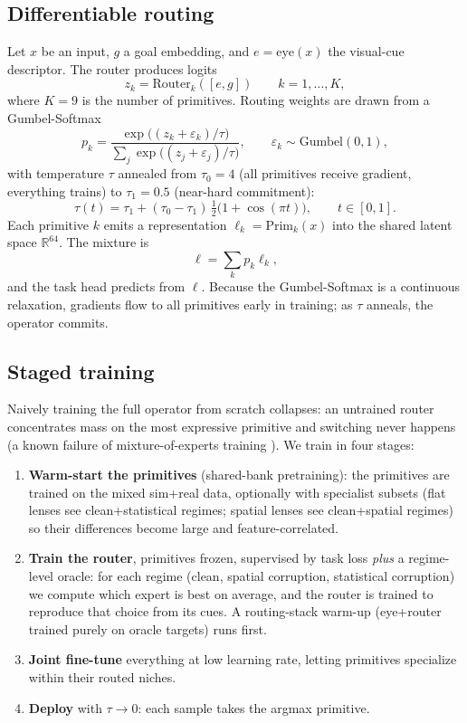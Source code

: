 \documentclass[11pt,a4paper]{article}
\begin{document}
\subsection{Differentiable routing}
\label{sec:routing}

Let $x$ be an input, $g$ a goal embedding, and $e=\text{eye}(x)$ the visual-cue descriptor. The router produces logits
\[
  z_k = \text{Router}_k([e, g]) \qquad k = 1, \dots, K,
\]
where $K=9$ is the number of primitives. Routing weights are drawn from a Gumbel-Softmax \cite{gumbel}
\[
  p_k = \frac{\exp\big((z_k + \varepsilon_k)/\tau\big)}{\sum_j \exp\big((z_j + \varepsilon_j)/\tau\big)},
  \qquad \varepsilon_k \sim \text{Gumbel}(0,1),
\]
with temperature $\tau$ annealed from $\tau_0 = 4$ (all primitives receive gradient, everything trains) to $\tau_1 = 0.5$ (near-hard commitment):
\[
  \tau(t) = \tau_1 + (\tau_0 - \tau_1)\,\tfrac12\big(1 + \cos(\pi t)\big),
  \qquad t \in [0,1].
\]
Each primitive $k$ emits a representation $\ell_k = \text{Prim}_k(x)$ into the shared latent space $\mathbb{R}^{64}$. The mixture is
\[
  \ell = \textstyle\sum_k p_k \ell_k,
\]
and the task head predicts from $\ell$. Because the Gumbel-Softmax is a continuous relaxation, gradients flow to all primitives early in training; as $\tau$ anneals, the operator commits.

\subsection{Staged training}
\label{sec:staged}

Naively training the full operator from scratch collapses: an untrained router concentrates mass on the most expressive primitive and switching never happens (a known failure of mixture-of-experts training \cite{switchtransformer}). We train in four stages:

\begin{enumerate}[leftmargin=1.6em]
  \item \textbf{Warm-start the primitives} (shared-bank pretraining): the primitives are trained on the mixed sim+real data, optionally with specialist subsets (flat lenses see clean+statistical regimes; spatial lenses see clean+spatial regimes) so their differences become large and feature-correlated.
  \item \textbf{Train the router}, primitives frozen, supervised by task loss \emph{plus} a regime-level oracle: for each regime (clean, spatial corruption, statistical corruption) we compute which expert is best on average, and the router is trained to reproduce that choice from its cues. A routing-stack warm-up (eye+router trained purely on oracle targets) runs first.
  \item \textbf{Joint fine-tune} everything at low learning rate, letting primitives specialize within their routed niches.
  \item \textbf{Deploy} with $\tau \to 0$: each sample takes the argmax primitive.
\end{enumerate}
\end{document}
